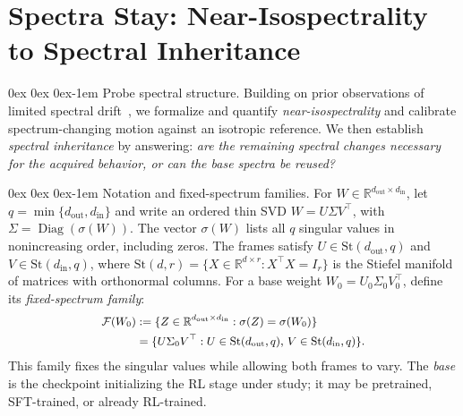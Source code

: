 \documentclass[11pt, a4paper]{utda}
\makeatletter
\renewcommand{\paragraph}{%
  \@startsection{paragraph}{4}%
  {\z@}{0ex \@plus 0ex \@minus 0ex}{-1em}%
  {\normalfont\normalsize\bfseries}%
}
\theoremstyle{plain}
\theoremstyle{definition}
\theoremstyle{remark}
\makeatother
\begin{document}
\section{Spectra Stay: Near-Isospectrality to Spectral Inheritance}
\label{sec:dynamics}

\paragraph{Probe spectral structure.}
Building on prior observations of limited spectral
drift~\cite{zhu2025path}, we formalize and quantify
\emph{near-isospectrality} and calibrate spectrum-changing motion
against an isotropic reference.
We then establish \emph{spectral inheritance} by answering:
\emph{are the remaining spectral changes necessary for the acquired
behavior, or can the base spectra be reused?}

\paragraph{Notation and fixed-spectrum families.}
For $W\in\mathbb{R}^{d_{\mathrm{out}}\times d_{\mathrm{in}}}$,
let $q=\min\{d_{\mathrm{out}},d_{\mathrm{in}}\}$ and write an ordered
thin SVD $W=U\Sigma V^\top$, with
$\Sigma=\operatorname{Diag}(\sigma(W))$.
The vector $\sigma(W)$ lists all $q$ singular values in
nonincreasing order, including zeros.
The frames satisfy $U\in\mathrm{St}(d_{\mathrm{out}},q)$ and
$V\in\mathrm{St}(d_{\mathrm{in}},q)$, where
$\mathrm{St}(d,r)=\{X\in\mathbb{R}^{d\times r}:X^\top X=I_r\}$
is the Stiefel manifold of matrices with orthonormal columns.
For a base weight $W_0=U_0\Sigma_0V_0^\top$, define its
\emph{fixed-spectrum family}:
\begin{equation}
\small
\label{eq:fixed_spectrum_family}
\begin{aligned}
\mathcal F(W_0)
&:=\{Z\in\mathbb{R}^{d_{\mathrm{out}}\times d_{\mathrm{in}}}:
       \sigma(Z)=\sigma(W_0)\}\\
&=\{U\Sigma_0V^\top:
       U\in\mathrm{St}(d_{\mathrm{out}},q),\,
       V\in\mathrm{St}(d_{\mathrm{in}},q)\}.
\end{aligned}
\end{equation}
This family fixes the singular values while allowing both frames
to vary.
The \emph{base} is the checkpoint initializing the RL stage under
study; it may be pretrained, SFT-trained, or already RL-trained.
\end{document}
